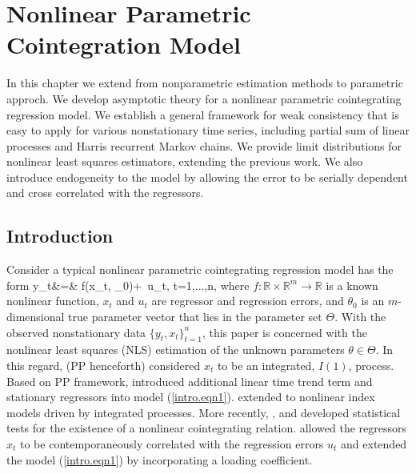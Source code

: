 
\chapter{Nonlinear Parametric Cointegration Model} 
\ifpdf
    \graphicspath{{Chapter6/Chapter6Figs/PNG/}{Chapter6/Chapter6Figs/PDF/}{Chapter6/Chapter6Figs/}}
\else
    \graphicspath{{Chapter6/Chapter6Figs/EPS/}{Chapter6/Chapter6Figs/}}
\fi

 In this chapter we extend from nonparametric estimation methods to parametric approch. We develop asymptotic theory for a nonlinear parametric cointegrating regression model. We establish a general framework for  weak consistency that is easy to apply for various nonstationary time series, including partial sum of linear processes and  Harris recurrent Markov chains. We provide  limit distributions for  nonlinear least squares  estimators,    extending the previous work.  We also introduce endogeneity to the model by allowing the error to be serially dependent and cross correlated with the regressors.



\section{Introduction} 
Consider a typical nonlinear parametric cointegrating regression model has the form
 \be y_t&=&
f(x_t, \theta_0)+\,  u_t, \quad t=1,...,n,
\ee
where  $f:\mathbb{R} \times \mathbb{R}^m \rightarrow \mathbb{R}$ is a known nonlinear function,
$x_t$ and  $u_t$ are regressor and regression errors, and   $\theta_0$ is an $m$-dimensional true parameter vector that lies in the parameter set $\Theta$. With the observed nonstationary data $\{y_t, x_t\}_{t=1}^n$, this paper is concerned with the nonlinear least squares (NLS) estimation of the unknown parameters $\theta\in \Theta$. In this regard, \cite{parkphillips2001} (PP henceforth) considered $x_t$ to be an integrated, $I(1)$, process. Based on PP framework, \cite{changparkphillips2001} introduced additional linear time trend term and stationary regressors into model (\ref{intro.eqn1}). \cite{changpark2003} extended to nonlinear index models driven by integrated processes.  More recently, \cite{choisaikkonen2010}, \cite{gaokinglutjostheim2009} and \cite{wangphillips2012} developed statistical tests  for the existence of a nonlinear cointegrating relation. \cite{changpark2010} allowed the regressors $x_t$ to be contemporaneously correlated with the regression errors $u_t$ and \cite{shiphillips2010} extended the model (\ref{intro.eqn1}) by incorporating a loading coefficient.


